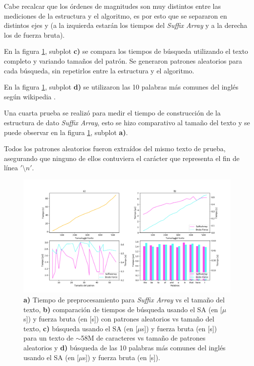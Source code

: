 \documentclass[]{article}
\begin{document}
Cabe recalcar que los órdenes de magnitudes son muy distintos entre las mediciones de la estructura y el algoritmo, es por esto que se separaron en distintos ejes y (a la izquierda estarán los tiempos del \emph{Suffix Array} y a la derecha los de fuerza bruta). 

En la figura \ref{fig}, subplot \textbf{c)} se compara los tiempos de búsqueda utilizando el texto completo y variando tamaños del patrón. Se generaron patrones aleatorios para cada búsqueda, sin repetirlos entre la estructura y el algoritmo.

En la figura \ref{fig}, subplot \textbf{d)} se utilizaron las 10 palabras más comunes del inglés según wikipedia \cite{common}.

Una cuarta prueba se realizó para medir el tiempo de construcción de la estructura de dato \emph{Suffix Array}, esto se hizo comparativo al tamaño del texto y se puede observar en la figura \ref{fig}, subplot \textbf{a)}.

Todos los patrones aleatorios fueron extraídos del mismo texto de prueba, asegurando que ninguno de ellos contuviera el carácter que representa el fin de línea $'\setminus n'$.


\begin{figure}[tb]
	\centering
	\includegraphics[width=1\textwidth]{fig}
	\caption{\textbf{a)} Tiempo de preprocesamiento para \emph{Suffix Array} vs el tamaño del texto, \textbf{b)} comparación de tiempos de búsqueda usando el SA (en [$\mu$s]) y fuerza bruta (en [s]) con patrones aleatorios vs tamaño del texto, \textbf{c)} búsqueda usando el SA (en [$\mu$s]) y fuerza bruta (en [s]) para un texto de $\sim$58M de caracteres vs tamaño de patrones aleatorios y \textbf{d)} búsqueda de las 10 palabras más comunes del inglés usando el SA (en [$\mu$s]) y fuerza bruta (en [s]).}
	\label{fig}
\end{figure}
\end{document}
